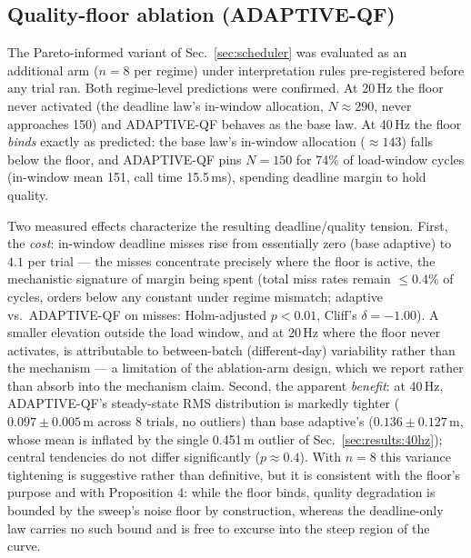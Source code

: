 \documentclass[conference]{IEEEtran}
\begin{document}
\subsection{Quality-floor ablation (ADAPTIVE-QF)}
\label{sec:results:qf}

The Pareto-informed variant of Sec.~\ref{sec:scheduler} was evaluated
as an additional arm ($n{=}8$ per regime) under interpretation rules
pre-registered before any trial ran. Both regime-level predictions were
confirmed. At 20\,Hz the floor never activated (the deadline law's
in-window allocation, $N \approx 290$, never approaches 150) and
ADAPTIVE-QF behaves as the base law. At 40\,Hz the floor \emph{binds}
exactly as predicted: the base law's in-window allocation ($\approx
143$) falls below the floor, and ADAPTIVE-QF pins $N = 150$ for 74\% of
load-window cycles (in-window mean 151, call time 15.5\,ms), spending
deadline margin to hold quality.

Two measured effects characterize the resulting deadline/quality
tension. First, the \emph{cost}: in-window deadline misses rise from
essentially zero (base adaptive) to $4.1$ per trial --- the misses
concentrate precisely where the floor is active, the mechanistic
signature of margin being spent (total miss rates remain $\leq 0.4\%$
of cycles, orders below any constant under regime mismatch; adaptive
vs.\ ADAPTIVE-QF on misses: Holm-adjusted $p < 0.01$, Cliff's
$\delta = -1.00$). A smaller elevation outside the load window, and at
20\,Hz where the floor never activates, is attributable to between-batch
(different-day) variability rather than the mechanism --- a limitation
of the ablation-arm design, which we report rather than absorb into the
mechanism claim. Second, the apparent \emph{benefit}: at 40\,Hz,
ADAPTIVE-QF's steady-state RMS distribution is markedly tighter
($0.097 \pm 0.005$\,m across 8 trials, no outliers) than base
adaptive's ($0.136 \pm 0.127$\,m, whose mean is inflated by the single
0.451\,m outlier of Sec.~\ref{sec:results:40hz}); central tendencies do
not differ significantly ($p \approx 0.4$). With $n{=}8$ this variance
tightening is suggestive rather than definitive, but it is consistent
with the floor's purpose and with Proposition 4: while the floor binds,
quality degradation is bounded by the sweep's noise floor by
construction, whereas the deadline-only law carries no such bound and
is free to excurse into the steep region of the curve.
\end{document}
